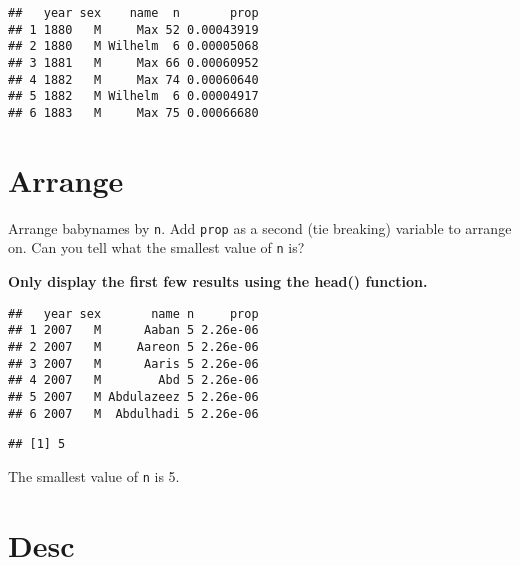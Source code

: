 \documentclass[
]{article}
\newenvironment{Shaded}{\begin{snugshade}}{\end{snugshade}}
\newcommand{\KeywordTok}[1]{\textcolor[rgb]{0.13,0.29,0.53}{\textbf{#1}}}
\newcommand{\NormalTok}[1]{#1}
\newcommand{\OperatorTok}[1]{\textcolor[rgb]{0.81,0.36,0.00}{\textbf{#1}}}
\newcommand{\StringTok}[1]{\textcolor[rgb]{0.31,0.60,0.02}{#1}}
\begin{document}
\begin{verbatim}
##   year sex    name  n       prop
## 1 1880   M     Max 52 0.00043919
## 2 1880   M Wilhelm  6 0.00005068
## 3 1881   M     Max 66 0.00060952
## 4 1882   M     Max 74 0.00060640
## 5 1882   M Wilhelm  6 0.00004917
## 6 1883   M     Max 75 0.00066680
\end{verbatim}

\hypertarget{arrange}{%
\section{Arrange}\label{arrange}}

Arrange babynames by \texttt{n}. Add \texttt{prop} as a second (tie
breaking) variable to arrange on. Can you tell what the smallest value
of \texttt{n} is?

\textbf{Only display the first few results using the head() function.}

\begin{Shaded}
\end{Shaded}

\begin{verbatim}
##   year sex       name n     prop
## 1 2007   M      Aaban 5 2.26e-06
## 2 2007   M     Aareon 5 2.26e-06
## 3 2007   M      Aaris 5 2.26e-06
## 4 2007   M        Abd 5 2.26e-06
## 5 2007   M Abdulazeez 5 2.26e-06
## 6 2007   M  Abdulhadi 5 2.26e-06
\end{verbatim}

\begin{Shaded}
\end{Shaded}

\begin{verbatim}
## [1] 5
\end{verbatim}

The smallest value of \texttt{n} is 5.

\hypertarget{desc}{%
\section{Desc}\label{desc}}
\end{document}

